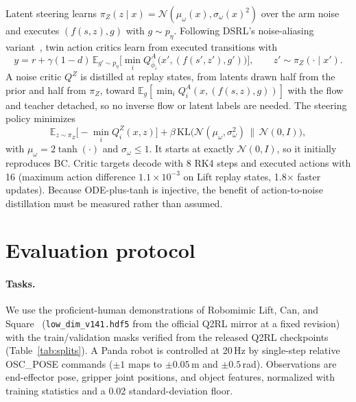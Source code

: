 \documentclass[10pt]{article}
\newcommand{\KL}{\mathrm{KL}}
\begin{document}
Latent steering learns $\pi_Z(z\mid x)=\mathcal{N}(\mu_\omega(x),\sigma_\omega(x)^2)$
over the arm noise and executes $(f(s,z),g)$ with $g\sim p_\eta$. Following
DSRL's noise-aliasing variant~\cite{wagenmaker2025dsrl}, twin action critics
learn from executed transitions with
\begin{equation}
  y = r + \gamma(1-d)\,\mathbb{E}_{g'\sim p_\eta}\Big[\min_i Q^A_{\bar\phi_i}\big(x',(f(s',z'),g')\big)\Big],
  \qquad z'\sim\pi_Z(\cdot\mid x').
\end{equation}
A noise critic $Q^Z$ is distilled at replay states, from latents drawn half from
the prior and half from $\pi_Z$, toward
$\mathbb{E}_g[\min_iQ^A_i(x,(f(s,z),g))]$ with the flow and teacher detached, so
no inverse flow or latent labels are needed. The steering policy minimizes
\begin{equation}
  \mathbb{E}_{z\sim\pi_Z}\big[-\min_i Q^Z_i(x,z)\big]
  + \beta\,\KL\big(\mathcal{N}(\mu_\omega,\sigma_\omega^2)\,\big\|\,\mathcal{N}(0,I)\big),
\end{equation}
with $\mu_\omega=2\tanh(\cdot)$ and $\sigma_\omega\le1$. It starts at exactly
$\mathcal{N}(0,I)$, so it initially reproduces BC. Critic targets decode with 8
RK4 steps and executed actions with 16 (maximum action difference
$1.1\times10^{-3}$ on Lift replay states, 1.8$\times$ faster updates). Because
ODE-plus-tanh is injective, the benefit of action-to-noise distillation must be
measured rather than assumed.

\section{Evaluation protocol}

\paragraph{Tasks.}
We use the proficient-human demonstrations of Robomimic Lift, Can, and
Square~\cite{mandlekar2021matters} (\texttt{low\_dim\_v141.hdf5} from the
official Q2RL mirror at a fixed revision) with the train/validation masks
verified from the released Q2RL checkpoints (Table~\ref{tab:splits}). A Panda
robot is controlled at 20\,Hz by single-step relative OSC\_POSE commands
($\pm1$ maps to $\pm0.05$\,m and $\pm0.5$\,rad). Observations are end-effector
pose, gripper joint positions, and object features, normalized with training
statistics and a 0.02 standard-deviation floor.
\end{document}
